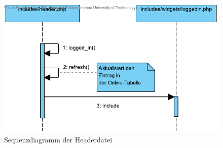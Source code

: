 \documentclass[fontsize = 12pt, paper = a4]{scrreprt}
\begin{document}
\begin{figure}[h]
\centering
\includegraphics[scale = 1]{header}
\caption[Sequenzdiagramm der Headerdatei]{Sequenzdiagramm der Headerdatei}
\label{header}
\end{figure}
\end{document}
